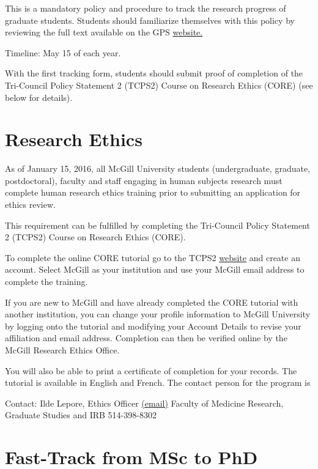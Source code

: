 \documentclass[
]{book}
\begin{document}
This is a mandatory policy and procedure to track the research progress of graduate students. Students should familiarize themselves with this policy by reviewing the full text available on the GPS \href{https://www.mcgill.ca/gps/students/progress-tracking}{website.}

Timeline: May 15 of each year.

With the first tracking form, students should submit proof of completion of the Tri-Council Policy Statement 2 (TCPS2) Course on Research Ethics (CORE) (see below for details).

\hypertarget{research-ethics}{%
\section{Research Ethics}\label{research-ethics}}

As of January 15, 2016, all McGill University students (undergraduate, graduate, postdoctoral), faculty and staff engaging in human subjects research must complete human research ethics training prior to submitting an application for ethics review.

This requirement can be fulfilled by completing the Tri-Council Policy Statement 2 (TCPS2) Course on Research Ethics (CORE).

To complete the online CORE tutorial go to the TCPS2 \href{http://tcps2core.ca/welcome}{website} and create an account. Select McGill as your institution and use your McGill email address to complete the training.

If you are new to McGill and have already completed the CORE tutorial with another institution, you can change your profile information to McGill University by logging onto the tutorial and modifying your Account Details to revise your affiliation and email address. Completion can then be verified online by the McGill Research Ethics Office.

You will also be able to print a certificate of completion for your records. The tutorial is available in English and French. The contact person for the program is

Contact:
Ilde Lepore, Ethics Officer \href{mailto:ilde.lepore@mcgill.ca}{(email)}
Faculty of Medicine Research, Graduate Studies and IRB
514-398-8302

\hypertarget{fast-track-from-msc-to-phd}{%
\section{Fast-Track from MSc to PhD}\label{fast-track-from-msc-to-phd}}
\end{document}

